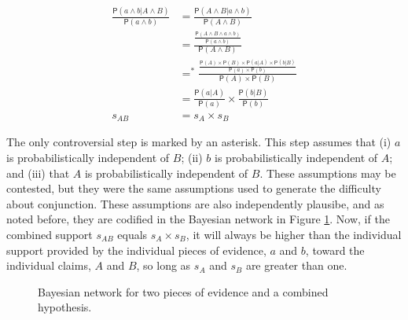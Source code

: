 \documentclass[10pt,dvipsnames,enabledeprecatedfontcommands]{scrartcl}
\newcommand{\et}{\wedge}
\newcommand{\pr}[1]{\mathsf{P}(#1)}
\begin{document}
\begin{align*}
\frac{\pr{a \wedge b| A\wedge B}}{\pr{a \wedge b}} & =  \frac{\pr{A \et B| a\wedge b}}{\pr{A \et B}}\\
& =  \frac{\frac{\pr{A \et B \et a \wedge b}}{\pr{a \et b}}}{\pr{A \et B}} \\ 
& =^*  \frac{\frac{\pr{A} \times \pr{B} \times \pr{a | A} \times \pr{b | B}}{\pr{a} \times \pr{b}}}{\pr{A} \times \pr{B}} \\ 
& =  \frac{\pr{a |A}}{\pr{a}} \times \frac{\pr{b |B}}{\pr{b}} \\
s_{AB}& =  s_{A}\times s_{B} 
 \end{align*}


\noindent  The only controversial step is marked by an asterisk. This
step assumes that (i) \(a\) is probabilistically independent of \(B\);
(ii) \(b\) is probabilistically independent of \(A\); and (iii) that
\(A\) is probabilistically independent of \(B\). These assumptions may
be contested, but they were the same assumptions used to generate the
difficulty about conjunction. These assumptions are also independently
plausibe, and as noted before, they are codified in the Bayesian network
in Figure \ref{network-conjunction}.
 Now,
if the combined support \(s_{AB}\) equals \(s_{A}\times s_{B}\), it will
always be higher than the individual support provided by the individual
pieces of evidence, \(a\) and \(b\), toward the individual claims, \(A\)
and \(B\), so long as \(s_{A}\) and \(s_{B}\) are greater than one.

\begin{center}
\begin{figure}[h!]
\caption{Bayesian network for two pieces of evidence and a combined hypothesis.}
\label{network-conjunction}
\end{figure}
\end{center}
\end{document}
